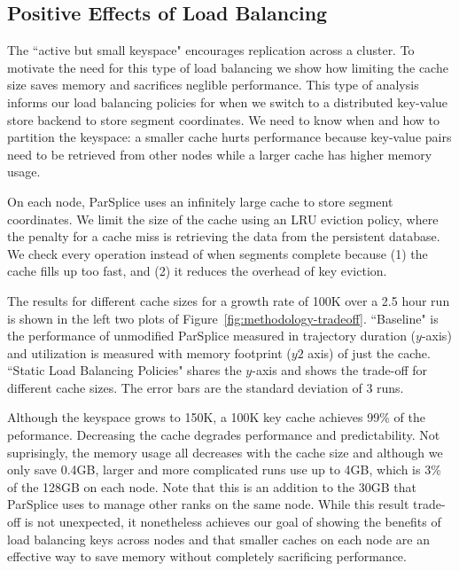 \subsection{Positive Effects of Load Balancing}
\label{sec:positive-effects-of-load-balancing}

The ``active but small keyspace" encourages replication across a cluster.  To
motivate the need for this type of load balancing we show how limiting the
cache size saves memory and sacrifices neglible performance. This type of
analysis informs our load balancing policies for when we switch to a
distributed key-value store backend to store segment coordinates.  We need to
know when and how to partition the keyspace: a smaller cache hurts performance
because key-value pairs need to be retrieved from other nodes while a larger
cache has higher memory usage. 

On each node, ParSplice uses an infinitely large cache to store segment
coordinates. We limit the size of the cache using an LRU eviction policy, where
the penalty for a cache miss is retrieving the data from the persistent
database.  We check every operation instead of when segments complete because
(1) the cache fills up too fast, and (2) it reduces the overhead of key
eviction. 

The results for different cache sizes for a growth rate of 100K over a 2.5 hour
run is shown in the left two plots of Figure~\ref{fig:methodology-tradeoff}.
``Baseline" is the performance of unmodified ParSplice  measured in trajectory
duration (\(y\)-axis) and utilization is measured with memory footprint (\(y2\)
axis) of just the cache.  ``Static Load Balancing Policies" shares the
\(y\)-axis and shows the trade-off for different cache sizes. The error bars
are the standard deviation of 3 runs. 

Although the keyspace grows to 150K, a 100K key cache achieves 99\% of the
peformance. Decreasing the cache degrades performance and predictability.  Not
suprisingly, the memory usage all decreases with the cache size and although we
only save 0.4GB, larger and more complicated runs use up to 4GB, which is 3\%
of the 128GB on each node. Note that this is an addition to the 30GB that
ParSplice uses to manage other ranks on the same node. While this result
trade-off is not unexpected, it nonetheless achieves our goal of showing the
benefits of load balancing keys across nodes and that smaller caches on each
node are an effective way to save memory without completely sacrificing
performance.

